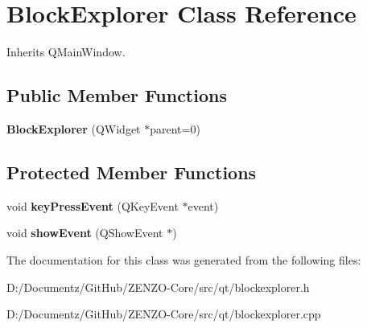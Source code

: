 \hypertarget{class_block_explorer}{}\section{Block\+Explorer Class Reference}
\label{class_block_explorer}


Inherits Q\+Main\+Window.

\subsection*{Public Member Functions}
\begin{DoxyCompactItemize}
\item 
\mbox{\label{class_block_explorer_aa1824a81f9b6d20dce7be419170ea02b}} 
{\bfseries Block\+Explorer} (Q\+Widget $\ast$parent=0)
\end{DoxyCompactItemize}
\subsection*{Protected Member Functions}
\begin{DoxyCompactItemize}
\item 
\mbox{\label{class_block_explorer_ae64a065d31adf1c1411dc1810cdd576c}} 
void {\bfseries key\+Press\+Event} (Q\+Key\+Event $\ast$event)
\item 
\mbox{\label{class_block_explorer_a2558e79dbb14bda3d9367f0b50240fa4}} 
void {\bfseries show\+Event} (Q\+Show\+Event $\ast$)
\end{DoxyCompactItemize}


The documentation for this class was generated from the following files\+:\begin{DoxyCompactItemize}
\item 
D\+:/\+Documentz/\+Git\+Hub/\+Z\+E\+N\+Z\+O-\/\+Core/src/qt/blockexplorer.\+h\item 
D\+:/\+Documentz/\+Git\+Hub/\+Z\+E\+N\+Z\+O-\/\+Core/src/qt/blockexplorer.\+cpp\end{DoxyCompactItemize}
